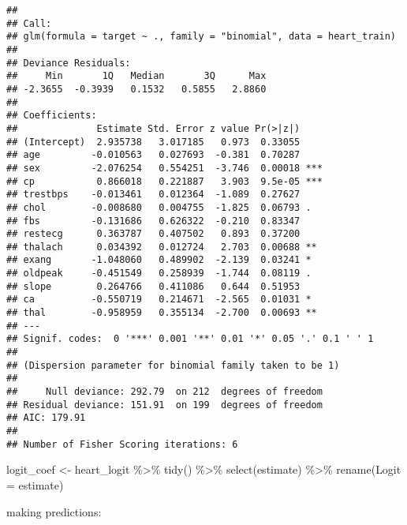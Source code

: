 \documentclass[
]{article}
\newenvironment{Shaded}{\begin{snugshade}}{\end{snugshade}}
\newcommand{\AttributeTok}[1]{\textcolor[rgb]{0.77,0.63,0.00}{#1}}
\newcommand{\FunctionTok}[1]{\textcolor[rgb]{0.00,0.00,0.00}{#1}}
\newcommand{\NormalTok}[1]{#1}
\newcommand{\OtherTok}[1]{\textcolor[rgb]{0.56,0.35,0.01}{#1}}
\newcommand{\SpecialCharTok}[1]{\textcolor[rgb]{0.00,0.00,0.00}{#1}}
\newcommand{\StringTok}[1]{\textcolor[rgb]{0.31,0.60,0.02}{#1}}
\begin{document}
\begin{verbatim}
## 
## Call:
## glm(formula = target ~ ., family = "binomial", data = heart_train)
## 
## Deviance Residuals: 
##     Min       1Q   Median       3Q      Max  
## -2.3655  -0.3939   0.1532   0.5855   2.8860  
## 
## Coefficients:
##              Estimate Std. Error z value Pr(>|z|)    
## (Intercept)  2.935738   3.017185   0.973  0.33055    
## age         -0.010563   0.027693  -0.381  0.70287    
## sex         -2.076254   0.554251  -3.746  0.00018 ***
## cp           0.866018   0.221887   3.903  9.5e-05 ***
## trestbps    -0.013461   0.012364  -1.089  0.27627    
## chol        -0.008680   0.004755  -1.825  0.06793 .  
## fbs         -0.131686   0.626322  -0.210  0.83347    
## restecg      0.363787   0.407502   0.893  0.37200    
## thalach      0.034392   0.012724   2.703  0.00688 ** 
## exang       -1.048060   0.489902  -2.139  0.03241 *  
## oldpeak     -0.451549   0.258939  -1.744  0.08119 .  
## slope        0.264766   0.411086   0.644  0.51953    
## ca          -0.550719   0.214671  -2.565  0.01031 *  
## thal        -0.958959   0.355134  -2.700  0.00693 ** 
## ---
## Signif. codes:  0 '***' 0.001 '**' 0.01 '*' 0.05 '.' 0.1 ' ' 1
## 
## (Dispersion parameter for binomial family taken to be 1)
## 
##     Null deviance: 292.79  on 212  degrees of freedom
## Residual deviance: 151.91  on 199  degrees of freedom
## AIC: 179.91
## 
## Number of Fisher Scoring iterations: 6
\end{verbatim}

\begin{Shaded}
\begin{Highlighting}[]
\NormalTok{logit\_coef }\OtherTok{\textless{}{-}}\NormalTok{ heart\_logit }\SpecialCharTok{\%\textgreater{}\%}
  \FunctionTok{tidy}\NormalTok{() }\SpecialCharTok{\%\textgreater{}\%} \FunctionTok{select}\NormalTok{(estimate) }\SpecialCharTok{\%\textgreater{}\%} 
  \FunctionTok{rename}\NormalTok{(}\AttributeTok{Logit =}\NormalTok{ estimate)}
\end{Highlighting}
\end{Shaded}

making predictions:

\begin{Shaded}
\end{Shaded}
\end{document}
